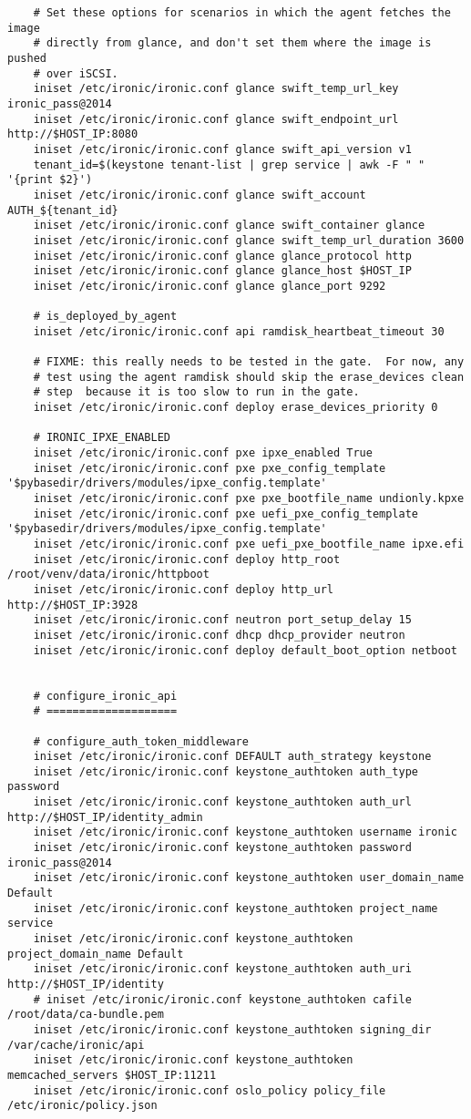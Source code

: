 \documentclass[a4paper,left=1.5cm,right=1.5cm,11pt]{article}
\begin{document}
\begin{lstlisting}
	# Set these options for scenarios in which the agent fetches the image
    # directly from glance, and don't set them where the image is pushed
    # over iSCSI.
	iniset /etc/ironic/ironic.conf glance swift_temp_url_key ironic_pass@2014
    iniset /etc/ironic/ironic.conf glance swift_endpoint_url http://$HOST_IP:8080
    iniset /etc/ironic/ironic.conf glance swift_api_version v1
	tenant_id=$(keystone tenant-list | grep service | awk -F " " '{print $2}')
	iniset /etc/ironic/ironic.conf glance swift_account AUTH_${tenant_id}
    iniset /etc/ironic/ironic.conf glance swift_container glance
    iniset /etc/ironic/ironic.conf glance swift_temp_url_duration 3600
    iniset /etc/ironic/ironic.conf glance glance_protocol http
    iniset /etc/ironic/ironic.conf glance glance_host $HOST_IP
    iniset /etc/ironic/ironic.conf glance glance_port 9292

	# is_deployed_by_agent
	iniset /etc/ironic/ironic.conf api ramdisk_heartbeat_timeout 30

	# FIXME: this really needs to be tested in the gate.  For now, any
    # test using the agent ramdisk should skip the erase_devices clean
    # step  because it is too slow to run in the gate.
	iniset /etc/ironic/ironic.conf deploy erase_devices_priority 0

	# IRONIC_IPXE_ENABLED
	iniset /etc/ironic/ironic.conf pxe ipxe_enabled True
    iniset /etc/ironic/ironic.conf pxe pxe_config_template '$pybasedir/drivers/modules/ipxe_config.template'
    iniset /etc/ironic/ironic.conf pxe pxe_bootfile_name undionly.kpxe
    iniset /etc/ironic/ironic.conf pxe uefi_pxe_config_template '$pybasedir/drivers/modules/ipxe_config.template'
    iniset /etc/ironic/ironic.conf pxe uefi_pxe_bootfile_name ipxe.efi
    iniset /etc/ironic/ironic.conf deploy http_root /root/venv/data/ironic/httpboot
    iniset /etc/ironic/ironic.conf deploy http_url http://$HOST_IP:3928
	iniset /etc/ironic/ironic.conf neutron port_setup_delay 15
	iniset /etc/ironic/ironic.conf dhcp dhcp_provider neutron
    iniset /etc/ironic/ironic.conf deploy default_boot_option netboot


	# configure_ironic_api
	# ====================

	# configure_auth_token_middleware
	iniset /etc/ironic/ironic.conf DEFAULT auth_strategy keystone
	iniset /etc/ironic/ironic.conf keystone_authtoken auth_type password
    iniset /etc/ironic/ironic.conf keystone_authtoken auth_url http://$HOST_IP/identity_admin
    iniset /etc/ironic/ironic.conf keystone_authtoken username ironic
    iniset /etc/ironic/ironic.conf keystone_authtoken password ironic_pass@2014
    iniset /etc/ironic/ironic.conf keystone_authtoken user_domain_name Default
    iniset /etc/ironic/ironic.conf keystone_authtoken project_name service
    iniset /etc/ironic/ironic.conf keystone_authtoken project_domain_name Default
    iniset /etc/ironic/ironic.conf keystone_authtoken auth_uri http://$HOST_IP/identity
    # iniset /etc/ironic/ironic.conf keystone_authtoken cafile /root/data/ca-bundle.pem
    iniset /etc/ironic/ironic.conf keystone_authtoken signing_dir /var/cache/ironic/api
    iniset /etc/ironic/ironic.conf keystone_authtoken memcached_servers $HOST_IP:11211
    iniset /etc/ironic/ironic.conf oslo_policy policy_file /etc/ironic/policy.json


\end{lstlisting}
\end{document}

